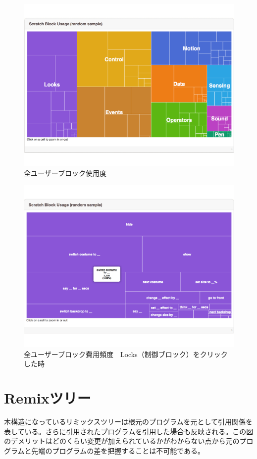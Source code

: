 \documentclass[a4paper,10pt,onecolumn,oneside,openany]{jsbook}
\begin{document}
\begin{figure}[ht]
  \centering
    \includegraphics[scale=0.5]{graphic/scratch_block0.pdf}
  \caption{全ユーザーブロック使用度}
 \end{figure}
 
 \begin{figure}[ht]
  \centering
    \includegraphics[scale=0.5]{graphic/scratch_block.pdf}
  \caption{全ユーザーブロック費用頻度　Locks（制御ブロック）をクリックした時}
 \end{figure}
 
 
 
\section{Remixツリー}
木構造になっているリミックスツリーは根元のプログラムを元として引用関係を表している。さらに引用されたプログラムを引用した場合も反映される。この図のデメリットはどのくらい変更が加えられているかがわからない点から元のプログラムと先端のプログラムの差を把握することは不可能である。
\end{document}
